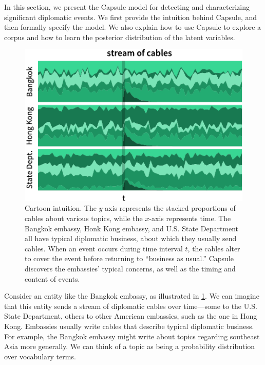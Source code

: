 
In this section, we present the Capsule model for detecting and
characterizing significant diplomatic events. We first provide the
intuition behind Capsule, and then formally specify the model. We also
explain how to use Capsule to explore a corpus and how to learn the
posterior distribution of the latent variables.

\begin{figure}
\centering
\includegraphics[width=\linewidth]{fig/cartoon.pdf}
\caption{Cartoon intuition. The $y$-axis represents the stacked
  proportions of cables about various topics, while the $x$-axis
  represents time. The Bangkok embassy, Honk Kong embassy, and
  U.S. State Department all have typical diplomatic business, about
  which they usually send cables. When an event occurs during time
  interval $t$, the cables alter to cover the event before returning
  to ``business as usual.'' Capsule discovers the embassies' typical
  concerns, as well as the timing and content of events.}
\label{fig:cartoon}
\end{figure}

Consider an entity like the Bangkok embassy, as illustrated in
\cref{fig:cartoon}. We can imagine that this entity sends a stream of
diplomatic cables over time---some to the U.S. State Department,
others to other American embassies, such as the one in Hong
Kong. Embassies usually write cables that describe typical diplomatic
business. For example, the Bangkok embassy might write about topics
regarding southeast Asia more generally. We can think of a topic as
being a probability distribution over vocabulary terms.

